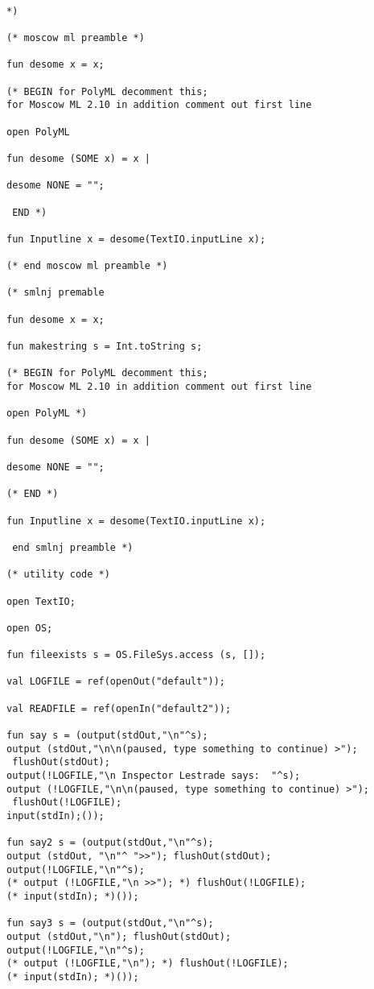 \documentclass[12pt]{article}
\begin{document}
\begin{verbatim}

*)

(* moscow ml preamble *)

fun desome x = x; 

(* BEGIN for PolyML decomment this; 
for Moscow ML 2.10 in addition comment out first line 

open PolyML

fun desome (SOME x) = x |

desome NONE = "";

 END *)

fun Inputline x = desome(TextIO.inputLine x);

(* end moscow ml preamble *)

(* smlnj premable 

fun desome x = x;

fun makestring s = Int.toString s;

(* BEGIN for PolyML decomment this; 
for Moscow ML 2.10 in addition comment out first line

open PolyML *)

fun desome (SOME x) = x |

desome NONE = "";

(* END *)

fun Inputline x = desome(TextIO.inputLine x);

 end smlnj preamble *)

(* utility code *)

open TextIO;

open OS;

fun fileexists s = OS.FileSys.access (s, []);

val LOGFILE = ref(openOut("default"));

val READFILE = ref(openIn("default2"));

fun say s = (output(stdOut,"\n"^s);
output (stdOut,"\n\n(paused, type something to continue) >");
 flushOut(stdOut);
output(!LOGFILE,"\n Inspector Lestrade says:  "^s);
output (!LOGFILE,"\n\n(paused, type something to continue) >");
 flushOut(!LOGFILE);
input(stdIn);());

fun say2 s = (output(stdOut,"\n"^s);
output (stdOut, "\n"^ ">>"); flushOut(stdOut);
output(!LOGFILE,"\n"^s);
(* output (!LOGFILE,"\n >>"); *) flushOut(!LOGFILE);
(* input(stdIn); *)());

fun say3 s = (output(stdOut,"\n"^s);
output (stdOut,"\n"); flushOut(stdOut);
output(!LOGFILE,"\n"^s);
(* output (!LOGFILE,"\n"); *) flushOut(!LOGFILE);
(* input(stdIn); *)());


\end{verbatim}
\end{document}
